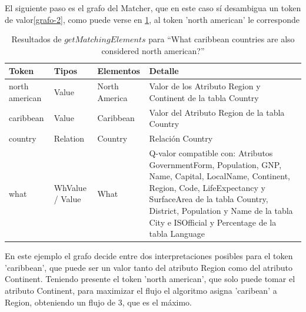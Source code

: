 El siguiente paso es el grafo del Matcher, que en este caso sí desambigua un token de valor\ref{grafo-2}, como puede verse en \ref{table:get-matching-elements-2}, al token 'north american' le corresponde
\begin{center}
\begin{table}[h]
\centering
\begin{tabular}{| p{2cm} | p{2cm} | p{2cm} | p{6cm} |}
\hline
Token & Tipos & Elementos & Detalle \\ \hline
north american & Value & North America & Valor de los Atributo Region y Continent de la tabla Country\\ \hline
caribbean & Value & Caribbean & Valor del Atributo Region de la tabla Country\\ \hline
country & Relation & Country & Relación Country\\ \hline
what & WhValue / Value & What & Q-valor compatible con: Atributos GovernmentForm, Population, GNP, Name, Capital, LocalName, Continent, Region, Code, LifeExpectancy y SurfaceArea de la tabla Country, District, Population y Name de la tabla City e ISOfficial y Percentage de la tabla Language\\ \hline
\end{tabular}
\caption{Resultados de $getMatchingElements$ para ``What caribbean countries are also considered north american?''}
\label{table:get-matching-elements-2}
\end{table}
\end{center}

En este ejemplo el grafo decide entre dos interpretaciones posibles para el token 'caribbean', que puede ser un valor tanto del atributo Region como del atributo Continent. Teniendo presente el token 'north american', que solo puede tomar el atributo Continent, para maximizar el flujo el algoritmo asigna 'caribean' a Region, obteniendo un flujo de 3, que es el máximo.

